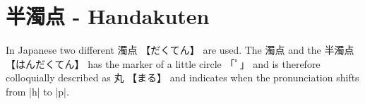 \section{半濁点 - Handakuten} \label{sec:Handakuten}

In Japanese two different {濁点} {【だくてん】} are used. The {濁点}  and  the
{半濁点} {【はんだくてん】} has the marker of a little circle {「ﾟ」} and is
therefore colloquially described as {丸} {【まる】} and indicates when the
pronunciation shifts from |h| to |p|.

